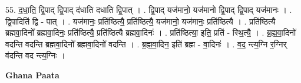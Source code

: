 \documentclass[17pt]{extarticle}
\begin{document}
55. द॒धा॒ति॒ द्वि॒पाद् द्वि॒पाद् द॑धाति दधाति द्वि॒पात् । . द्वि॒पाद् यज॑मानो॒ यज॑मानो द्वि॒पाद् द्वि॒पाद् यज॑मानः । . द्वि॒पादिति॑ द्वि - पात् । . यज॑मानः॒ प्रति॑ष्ठित्यै॒ प्रति॑ष्ठित्यै॒ यज॑मानो॒ यज॑मानः॒ प्रति॑ष्ठित्यै । . प्रति॑ष्ठित्यै ब्रह्मवा॒दिनो᳚ ब्रह्मवा॒दिनः॒ प्रति॑ष्ठित्यै॒ प्रति॑ष्ठित्यै ब्रह्मवा॒दिनः॑ । . प्रति॑ष्ठित्या॒ इति॒ प्रति॑ - स्थि॒त्यै॒ । . ब्र॒ह्म॒वा॒दिनो॑ वदन्ति वदन्ति ब्रह्मवा॒दिनो᳚ ब्रह्मवा॒दिनो॑ वदन्ति । . ब्र॒ह्म॒वा॒दिन॒ इति॑ ब्रह्म - वा॒दिनः॑ । . व॒द॒ न्त्य॒ग्नि र॒ग्निर् व॑दन्ति वद न्त्य॒ग्निः । \newline

\textbf{Ghana Paata } \newline
\end{document}
